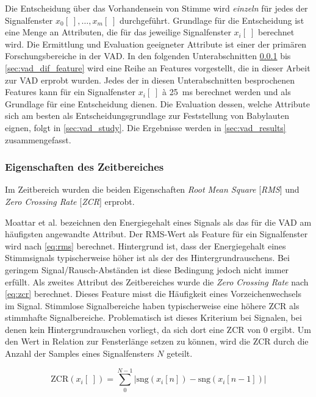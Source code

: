 Die Entscheidung über das Vorhandensein von Stimme wird \emph{einzeln} für jedes der Signalfenster $x_0[\;] , \ldots , x_m[\;]$ durchgeführt. Grundlage für die Entscheidung ist eine Menge an Attributen, die für das jeweilige Signalfenster $x_i[\;]$ berechnet wird. Die Ermittlung und Evaluation geeigneter Attribute ist einer der primären Forschungsbereiche in der VAD. In den folgenden Unterabschnitten \ref{sec:vad_time_features} bis \ref{sec:vad_dif_feature} wird eine Reihe an Features vorgestellt, die in dieser Arbeit zur VAD erprobt wurden. Jedes der in diesen Unterabschnitten besprochenen Features kann für ein Signalfenster $x_i[\;]$ \`{a} \SI{25}{\milli\second} berechnet werden und als Grundlage für eine Entscheidung dienen. Die Evaluation dessen, welche Attribute sich am besten als Entscheidungsgrundlage zur Feststellung von Babylauten eignen, folgt in \autoref{sec:vad_study}. Die Ergebnisse werden in \autoref{sec:vad_results} zusammengefasst.

\subsubsection{Eigenschaften des Zeitbereiches}
\label{sec:vad_time_features}

Im Zeitbereich wurden die beiden Eigenschaften \emph{Root Mean Square} [\emph{RMS}] und \emph{Zero Crossing Rate} [\emph{ZCR}] erprobt.

Moattar et al. \cite[S. 2549]{vad_Easy} bezeichnen den Energiegehalt eines Signals als das für die VAD am häufigsten angewandte Attribut. Der RMS-Wert als Feature für ein Signalfenster wird nach \autoref{eq:rms} berechnet. Hintergrund ist, dass der Energiegehalt eines Stimmsignals typischerweise höher ist als der des Hintergrundrauschens. Bei geringem Signal/Rausch-Abständen ist diese Bedingung jedoch nicht immer erfüllt. Als zweites Attribut des Zeitbereiches wurde die \emph{Zero Crossing Rate} nach \autoref{eq:zcr} berechnet. Dieses Feature misst die Häufigkeit eines Vorzeichenwechsels im Signal. Stimmlose Signalbereiche haben typischerweise eine höhere ZCR als stimmhafte Signalbereiche. Problematisch ist dieses Kriterium bei Signalen, bei denen kein Hintergrundrauschen vorliegt, da sich dort eine ZCR von 0 ergibt.\cite[S. 335 - 336]{vad_ceps} Um den Wert in Relation zur Fensterlänge setzen zu können, wird die ZCR durch die Anzahl der Samples eines Signalfensters $N$ geteilt.

\begin{equation}
\text{ZCR}(x_i[\;]) = \sum_{0}^{N-1}|\text{sng}(x_i[n])-\text{sng}(x_i[n-1])|
\label{eq:zcr}
\end{equation}

